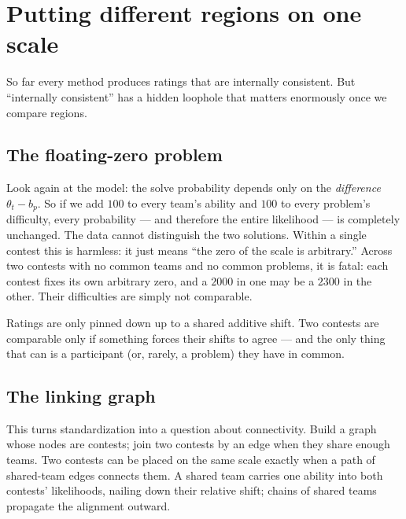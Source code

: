 \documentclass[11pt]{report}
\theoremstyle{definition}
\numberwithin{equation}{chapter}
\begin{document}
\chapter{Putting different regions on one scale}

So far every method produces ratings that are internally consistent. But
``internally consistent'' has a hidden loophole that matters enormously once we
compare regions.

\section{The floating-zero problem}

Look again at the model: the solve probability depends only on the
\emph{difference} $\theta_t-b_p$. So if we add $100$ to every team's ability and
$100$ to every problem's difficulty, every probability --- and therefore the
entire likelihood --- is completely unchanged. The data cannot distinguish the
two solutions. Within a single contest this is harmless: it just means ``the zero
of the scale is arbitrary.'' Across two contests with no common teams and no
common problems, it is fatal: each contest fixes its own arbitrary zero, and a
$2000$ in one may be a $2300$ in the other. Their difficulties are simply not
comparable.

\begin{keyidea}
Ratings are only pinned down up to a shared additive shift. Two contests are
comparable only if something forces their shifts to agree --- and the only thing
that can is a participant (or, rarely, a problem) they have in common.
\end{keyidea}

\section{The linking graph}

This turns standardization into a question about connectivity. Build a graph whose
nodes are contests; join two contests by an edge when they share enough teams.
Two contests can be placed on the same scale exactly when a path of shared-team
edges connects them. A shared team carries one ability into both contests'
likelihoods, nailing down their relative shift; chains of shared teams propagate
the alignment outward.
\end{document}
